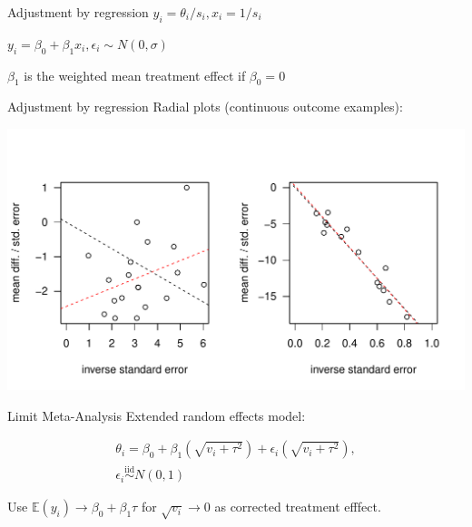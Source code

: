 \documentclass[english]{beamer}\usepackage[]{graphicx}\usepackage[]{color}
\makeatletter
\def\maxwidth{ %
  \ifdim\Gin@nat@width>\linewidth
    \linewidth
  \else
    \Gin@nat@width
  \fi
}
\newenvironment{knitrout}{}{} %
\makeatother
\begin{document}
\begin{frame}{Adjustment by regression}
$y_i = \theta_i/s_i, x_i = 1/s_i$

$y_i = \beta_0 + \beta_1 x_i, \epsilon_i \sim N(0, \sigma)$

$\beta_1$ is the weighted mean treatment effect if $\beta_0 = 0$
\end{frame}


\begin{frame}{Adjustment by regression}
Radial plots (continuous outcome examples):

\vspace{-1.1cm}

\begin{knitrout}
\color{fgcolor}
\includegraphics[width=\maxwidth]{figure/unnamed-chunk-8-1} 

\end{knitrout}
\end{frame}



\begin{frame}[fragile]{Limit Meta-Analysis}
Extended random effects model:

\vspace{-4mm}
\begin{align}
\theta_i = \beta_0 + \beta_1(\sqrt{v_i + \tau^2}) + \epsilon_i(\sqrt{v_i + \tau^2}), \nonumber \\
\epsilon_{i} \stackrel{\textrm{iid}}{\sim} N(0,1) \nonumber
\end{align}

Use $\mathbb{E}(y_{i}) \rightarrow \beta_{0} + \beta_{1}\tau$ for $\sqrt{v_{i}} \rightarrow 0$
as corrected treatment efffect.
\end{frame}
\end{document}

